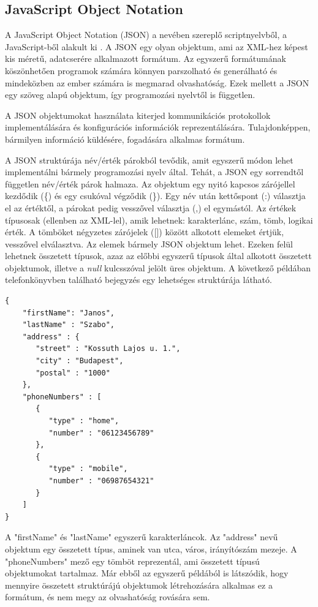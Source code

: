 \documentclass[a4paper,12pt]{report}
\begin{document}
\subsection{JavaScript Object Notation}
A JavaScript Object Notation (JSON) a nevében szereplő scriptnyelvből, a JavaScript-ből alakult ki \cite{json}. A JSON egy olyan objektum, ami az XML-hez képest kis méretű, adatcserére alkalmazott formátum. Az egyszerű formátumának köszönhetően programok számára könnyen parszolható és generálható és mindeközben az ember számára is megmarad olvashatóság. Ezek mellett a JSON egy szöveg alapú objektum, így programozási nyelvtől is független.
\par A JSON objektumokat használata kiterjed kommunikációs protokollok implementálására és konfigurációs információk reprezentálására. Tulajdonképpen, bármilyen információ küldésére, fogadására alkalmas formátum.
\par A JSON struktúrája név/érték párokból tevődik, amit egyszerű módon lehet implementálni bármely programozási nyelv által. Tehát, a JSON egy sorrendtől független név/érték párok halmaza. Az objektum egy nyitó kapcsos zárójellel kezdődik (\{) és egy csukóval végződik (\}). Egy név után kettőspont (:) választja el az értéktől, a párokat pedig vesszővel választja (,) el egymástól. Az értékek típusosak (ellenben az XML-lel), amik lehetnek: karakterlánc, szám, tömb, logikai érték. A tömböket négyzetes zárójelek ([]) között alkotott elemeket értjük, vesszővel elválasztva. Az elemek bármely JSON objektum lehet. Ezeken felül lehetnek összetett típusok, azaz az előbbi egyszerű típusok által alkotott összetett objektumok, illetve a \textit{null} kulcsszóval jelölt üres objektum. A következő példában telefonkönyvben található bejegyzés egy lehetséges struktúrája látható.
\begin{verbatim}
{
    "firstName": "Janos",
    "lastName" : "Szabo",
    "address" : {
       "street" : "Kossuth Lajos u. 1.",
       "city" : "Budapest",
       "postal" : "1000"
    },
    "phoneNumbers" : [
       {
          "type" : "home",
          "number" : "06123456789"
       },
       {
          "type" : "mobile",
          "number" : "06987654321"
       }
    ]
}
\end{verbatim}

A "firstName" és "lastName" egyszerű karakterláncok. Az "address" nevű objektum egy összetett típus, aminek van utca, város, irányítószám mezeje. A "phoneNumbers" mező egy tömböt reprezentál, ami összetett típusú objektumokat tartalmaz. Már ebből az egyszerű példából is látszódik, hogy mennyire összetett struktúrájú objektumok létrehozására alkalmas ez a formátum, és nem megy az olvashatóság rovására sem.
\end{document}
